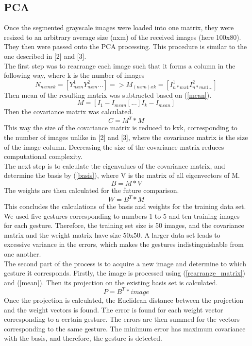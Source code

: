 \documentclass[12pt]{report}
\begin{document}
\subsection*{PCA}
Once the segmented grayscale images were loaded into one matrix, they were resized to an arbitrary average size (nxm) of the received images (here 100x80). They then were passed onto the PCA processing. This procedure is similar to the one described in [2] and [3].\\
The first step was to rearrange each image such that it forms a column in the following way, where k is the number of images
\begin{equation}\label{rearrange_matrix}
    N_{nxmxk} = [Y^1_{nxm} Y^2_{nxm} ...] => M_{(nxm)xk} = [I^1_{n*mx1} I^2_{n*mx1 ...}]
\end{equation}
Then mean of the resulting matrix was subtracted based on (\ref{mean}).
\begin{equation}\label{mean}
	M = [I_1 - I_{mean} [...] I_k - I_{mean}]
\end{equation}
Then the covariance matrix was calculated. 
\begin{equation}\label{covariance}
	C = M^T*M
\end{equation}
This way the size of the covariance matrix is reduced to kxk, corresponding to the number of images unlike in [2] and [3], where the covariance matrix is the size of the image column. Decreasing the size of the covariance matrix reduces computational complexity. \\
The next step is to calculate the eigenvalues of the covariance matrix, and determine the basis by (\ref{basis}), where V is the matrix of all eigenvectors of M. 
\begin{equation}\label{basis}
	B = M*V
\end{equation}
The weights are then calculated for the future comparison. 
\begin{equation}
	W = B^T*M
\end{equation}
This concludes the calculations of the basis and weights for the training data set. We used five gestures corresponding to numbers 1 to 5 and ten training images for each gesture. Therefore, the training set size is 50 images, and the covariance matrix and the weight matrix have size 50x50. A larger data set leads to excessive variance in the errors, which makes the gestures indistinguishable from one another. \\
The second part of the process is to acquire a new image and determine to which gesture it corresponds.
Firstly, the image is processed using (\ref{rearrange_matrix}) and (\ref{mean}). Then its projection on the existing basis set is calculated.
\begin{equation}
	P = B^T*image
\end{equation}
Once the projection is calculated, the Euclidean distance between the projection and the weight vectors is found. The error is found for each weight vector corresponding to a certain gesture. The errors are then summed for the vectors corresponding to the same gesture. The minimum error has maximum covariance with the basis, and therefore, the gesture is detected. 
\end{document}
